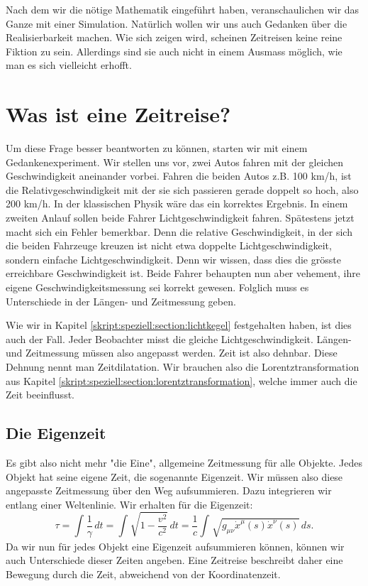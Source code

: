 \begin{refsection}
Nach dem wir die nötige Mathematik eingeführt haben, veranschaulichen wir das Ganze mit einer Simulation. Natürlich wollen wir uns auch Gedanken über die Realisierbarkeit machen. Wie sich zeigen wird, scheinen Zeitreisen keine reine Fiktion zu sein. Allerdings sind sie auch nicht in einem Ausmass möglich, wie man es sich vielleicht erhofft.

\section{Was ist eine Zeitreise?}
Um diese Frage besser beantworten zu können, starten wir mit einem Gedankenexperiment. Wir stellen uns vor, zwei Autos fahren mit der gleichen Geschwindigkeit aneinander vorbei. Fahren die beiden Autos z.B. 100 km/h, ist die Relativgeschwindigkeit mit der sie sich passieren gerade doppelt so hoch, also 200 km/h. In der klassischen Physik wäre das ein korrektes Ergebnis. In einem zweiten Anlauf sollen beide Fahrer Lichtgeschwindigkeit fahren. Spätestens jetzt macht sich ein Fehler bemerkbar. Denn die relative Geschwindigkeit, in der sich die beiden Fahrzeuge kreuzen ist nicht etwa doppelte Lichtgeschwindigkeit, sondern einfache Lichtgeschwindigkeit. Denn wir wissen, dass dies die grösste erreichbare Geschwindigkeit ist.
Beide Fahrer behaupten nun aber vehement, ihre eigene Geschwindigkeitsmessung sei korrekt gewesen. Folglich muss es Unterschiede in der Längen- und Zeitmessung geben.

Wie wir in Kapitel \ref{skript:speziell:section:lichtkegel} festgehalten haben, ist dies auch der Fall. Jeder Beobachter misst die gleiche Lichtgeschwindigkeit. Längen- und Zeitmessung müssen also angepasst werden. Zeit ist also dehnbar. Diese Dehnung nennt man Zeitdilatation. Wir brauchen also die Lorentztransformation aus Kapitel \ref{skript:speziell:section:lorentztransformation}, welche immer auch die Zeit beeinflusst.

\subsection{Die Eigenzeit}
Es gibt also nicht mehr "die Eine", allgemeine Zeitmessung für alle Objekte. Jedes Objekt hat seine eigene Zeit, die sogenannte Eigenzeit. Wir müssen also diese angepasste Zeitmessung über den Weg aufsummieren.
Dazu integrieren wir entlang einer Weltenlinie. Wir erhalten für die Eigenzeit:
\begin{equation}\label{Eigenzeit}
\tau
=
\int_{}^{}\frac{1}{\gamma}\,dt=\int_{}^{}\sqrt{1-\frac{v^2}{c^2}}\,dt
=
\frac{1}{c}\int_{}^{}\sqrt{g_{\mu\nu}\dot{x}^{\mu}(s)\dot{x}^{\nu}(s)}\,ds.
\end{equation}
Da wir nun für jedes Objekt eine Eigenzeit aufsummieren können, können wir auch Unterschiede dieser Zeiten angeben.
Eine Zeitreise beschreibt daher eine Bewegung durch die Zeit, abweichend von der Koordinatenzeit.


\end{refsection}
